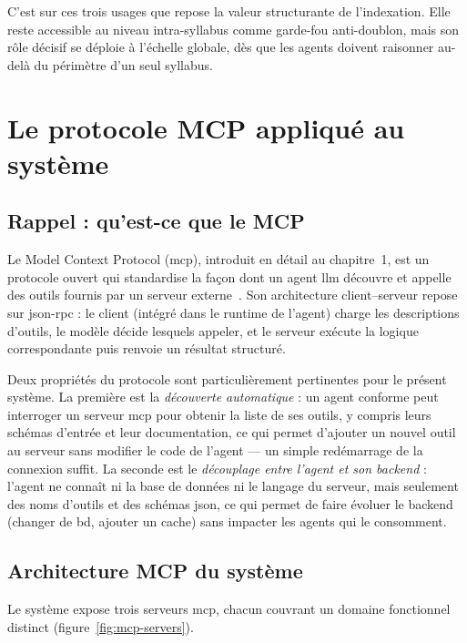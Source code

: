 C'est sur ces trois usages que repose la valeur structurante de l'indexation.
Elle reste accessible au niveau intra-syllabus comme garde-fou anti-doublon,
mais son rôle décisif se déploie à l'échelle globale, dès que les agents
doivent raisonner au-delà du périmètre d'un seul syllabus.

\section{Le protocole MCP appliqué au système}
\label{sec:mcp-systeme}

\subsection{Rappel : qu'est-ce que le MCP}

Le Model Context Protocol (\gls{mcp}), introduit en détail au chapitre~1, est
un protocole ouvert qui standardise la façon dont un agent \gls{llm} découvre
et appelle des outils fournis par un serveur externe~\cite{anthropic2024,mcpspec}.
Son architecture client--serveur repose sur \gls{json}-\gls{rpc} : le client
(intégré dans le runtime de l'agent) charge les descriptions d'outils, le
modèle décide lesquels appeler, et le serveur exécute la logique
correspondante puis renvoie un résultat structuré.

Deux propriétés du protocole sont particulièrement pertinentes pour
le présent système. La première est la \emph{découverte automatique} :
un agent conforme peut interroger un serveur \gls{mcp} pour obtenir
la liste de ses outils, y compris leurs schémas d'entrée et leur
documentation, ce qui permet d'ajouter un nouvel outil au serveur
sans modifier le code de l'agent — un simple redémarrage de la
connexion suffit. La seconde est le \emph{découplage entre l'agent
et son backend} : l'agent ne connaît ni la base de données ni le
langage du serveur, mais seulement des noms d'outils et des schémas
\gls{json}, ce qui permet de faire évoluer le backend (changer de
\gls{bd}, ajouter un cache) sans impacter les agents qui le
consomment.

\subsection{Architecture MCP du système}
\label{sec:mcp-archi}

Le système expose trois serveurs \gls{mcp}, chacun couvrant un domaine
fonctionnel distinct (figure~\ref{fig:mcp-servers}).

